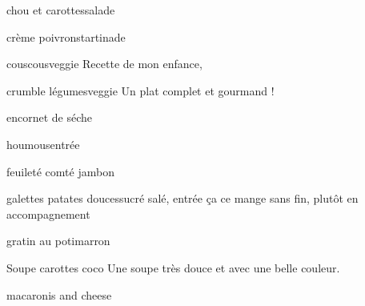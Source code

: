 	\begin{recette}{chou et carottes}{salade}
	\end{recette}
	
	\begin{recette}{crème poivrons}{tartinade}
	\end{recette}
	
	\begin{recette}{\heart couscous}{veggie}
		Recette de mon enfance,
	\end{recette}
	
	
	\begin{recette}{\heart crumble légumes}{veggie}
		Un plat complet et gourmand ! 
	\end{recette}
	
	\begin{recette}{encornet de séche}{}
	\end{recette}
	
	\begin{recette}{houmous}{entrée}
	\end{recette}
	
	\begin{recette}{feuileté comté jambon}{}
	\end{recette}
	
	\begin{recette}{\heart galettes patates douces}{sucré salé, entrée}
		ça ce mange sans fin, plutôt en accompagnement
	\end{recette}
	
	\begin{recette}{gratin au potimarron}{}
	\end{recette}
	
	\begin{recette}{\heart Soupe carottes coco}{}
		Une soupe très douce et avec une belle couleur.
	\end{recette}
	
	\begin{recette}{macaronis and cheese}{}
	\end{recette}
	
